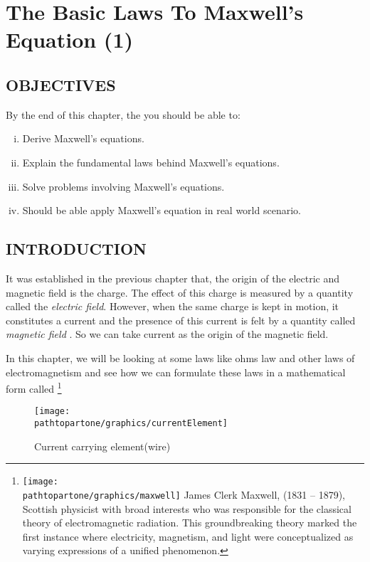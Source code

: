 \chapter{The Basic Laws To Maxwell's Equation (1)}\label{lec:lec18}

\section{OBJECTIVES}

\begin{mdframed}[backgroundcolor=lightblue, linewidth=1pt, hidealllines=true]
	By the end of this chapter, the you should be able to:
	\begin{enumerate}[(i)]
		\item Derive Maxwell's equations. 
		
		\item Explain the fundamental laws behind Maxwell's equations.
		
		\item Solve problems involving Maxwell's equations.
		
		\item Should be able apply Maxwell's equation in real world scenario.
	\end{enumerate}
\end{mdframed}	

\section{INTRODUCTION}
It was established in the previous chapter that, the origin of the electric and magnetic field is the charge. The effect of this charge is measured by a quantity called the \emph{electric field}. However, when the same charge is kept in motion, it constitutes a current and the presence of this current is felt by a quantity called \emph{magnetic field} . So we can take current as the origin of the magnetic field. 

In this chapter, we will be looking at some laws like ohms law and other laws of electromagnetism and see how we can formulate these laws in a mathematical form called 
\footnote{\texttt{[image: \\pathtopartone/graphics/maxwell]}
James Clerk Maxwell, (1831 – 1879), Scottish physicist with broad interests who was responsible for the classical theory of electromagnetic radiation. This groundbreaking theory marked the first instance where electricity, magnetism, and light were conceptualized as varying expressions of a unified phenomenon.
}
\begin{figure}[h]
	\centering
	\texttt{[image: \\pathtopartone/graphics/currentElement]}
	\caption{Current carrying element(wire)}
	\label{fig 5.1:currentelement}
\end{figure}

